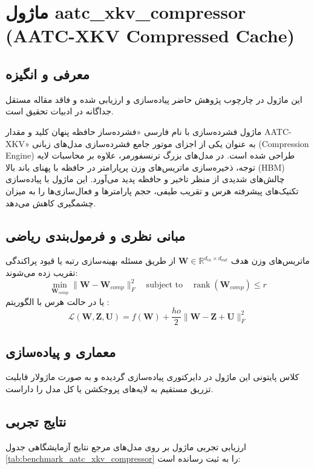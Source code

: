 \section{ماژول aatc\_xkv\_compressor (AATC-XKV Compressed Cache)}
\label{sec:module_aatc_xkv_compressor}

\subsection{معرفی و انگیزه}
این ماژول در چارچوب پژوهش حاضر پیاده‌سازی و ارزیابی شده و فاقد مقاله مستقل جداگانه در ادبیات تحقیق است.

ماژول فشرده‌سازی  با نام فارسی «فشرده‌ساز حافظه پنهان کلید و مقدار AATC-XKV» به عنوان یکی از اجزای موتور جامع فشرده‌سازی مدل‌های زبانی (Compression Engine) طراحی شده است. در مدل‌های بزرگ ترنسفورمر، علاوه بر محاسبات لایه توجه، ذخیره‌سازی ماتریس‌های وزن پرپارامتر در حافظه با پهنای باند بالا (HBM) چالش‌های شدیدی از منظر تاخیر و حافظه پدید می‌آورد. این ماژول با پیاده‌سازی تکنیک‌های پیشرفته هرس و تقریب طیفی، حجم پارامترها و فعال‌سازی‌ها را به میزان چشمگیری کاهش می‌دهد.

\subsection{مبانی نظری و فرمول‌بندی ریاضی}
ماتریس‌های وزن هدف $\mathbf{W} \in \mathbb{R}^{d_{in} \times d_{out}}$ از طریق مسئله بهینه‌سازی رتبه یا قیود پراکندگی تقریب زده می‌شوند:
 \begin{equation}
\min_{\mathbf{W}_{comp}} \|\mathbf{W} - \mathbf{W}_{comp}\|_F^2 \quad \text{subject to} \quad \operatorname{rank}(\mathbf{W}_{comp}) \le r
\end{equation}
یا در حالت هرس با الگوریتم :
 \begin{equation}
\mathcal{L}(\mathbf{W}, \mathbf{Z}, \mathbf{U}) = f(\mathbf{W}) +\frac{
ho}{2} \|\mathbf{W} - \mathbf{Z} + \mathbf{U}\|_F^2
\end{equation}

\subsection{معماری و پیاده‌سازی}
کلاس پایتونی این ماژول در دایرکتوری  پیاده‌سازی گردیده و به صورت ماژولار قابلیت تزریق مستقیم به لایه‌های پروجکشن یا کل مدل را داراست.

\subsection{نتایج تجربی}
ارزیابی تجربی ماژول  بر روی مدل‌های مرجع نتایج آزمایشگاهی جدول 
\ref{tab:benchmark_aatc_xkv_compressor} را به ثبت رسانده است:

